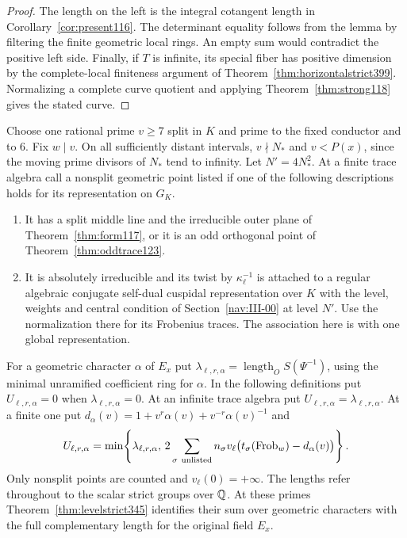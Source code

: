 \documentclass[a4paper,11pt]{article}
\theoremstyle{definition}
\theoremstyle{remark}
\numberwithin{equation}{section}
\begin{document}
\begin{proof}
The length on the left is the integral cotangent length in
Corollary~\ref{cor:present116}. The determinant equality follows
from the lemma by filtering the finite geometric local rings.
An empty sum would contradict the positive left side. Finally,
if \(T\) is infinite, its special fiber has positive dimension
by the complete-local finiteness argument of
Theorem~\ref{thm:horizontalstrict399}. Normalizing a complete
curve quotient and applying Theorem~\ref{thm:strong118} gives
the stated curve.
\end{proof}

Choose one rational prime \(v\ge7\) split in \(K\) and prime
to the fixed conductor and to \(6\). Fix \(w\mid v\). On all
sufficiently distant intervals, \(v\nmid N_*\) and \(v<P(x)\),
since the moving prime divisors of \(N_*\) tend to infinity.
Let \(N'=4N_*^2\). At a finite trace algebra call a nonsplit
geometric point listed if one of the following descriptions
holds for its representation on \(G_K\).

\begin{enumerate}
\item It has a split middle line and the irreducible outer plane
of Theorem~\ref{thm:form117}, or it is an odd orthogonal point
of Theorem~\ref{thm:oddtrace123}.
\item It is absolutely irreducible and its twist by
\(\kappa_\ell^{-1}\) is attached to a regular algebraic
conjugate self-dual cuspidal representation over \(K\) with the
level, weights and central condition of Section~\ref{nav:III-00}
at level \(N'\). Use the normalization there for its Frobenius
traces. The association here is with one global representation.
\end{enumerate}

For a geometric character \(\alpha\) of \(E_x\) put
\(\lambda_{\ell,r,\alpha}=\operatorname{length}_O S(\Psi^{-1})\),
using the minimal unramified coefficient ring for \(\alpha\).
In the following definitions put \(U_{\ell,r,\alpha}=0\) when
\(\lambda_{\ell,r,\alpha}=0\). At an infinite trace algebra put
\(U_{\ell,r,\alpha}=\lambda_{\ell,r,\alpha}\). At a finite
one put \(d_\alpha(v)=1+v^r\alpha(v)+v^{-r}\alpha(v)^{-1}\) and
\[
 U_{\ell,r,\alpha}=\min\!\left\{\lambda_{\ell,r,\alpha},\,
    2\sum_{\sigma\ {\rm unlisted}}n_\sigma
    v_\ell\bigl(t_\sigma(\operatorname{Frob}_w)-d_\alpha(v)\bigr)
                                     \right\}.
\]
Only nonsplit points are counted and \(v_\ell(0)=+\infty\).
The lengths refer throughout to the scalar strict groups over
\(\mathbb Q\). At these primes Theorem~\ref{thm:levelstrict345}
identifies their sum over geometric characters with the full
complementary length for the original field \(E_x\).
\end{document}
